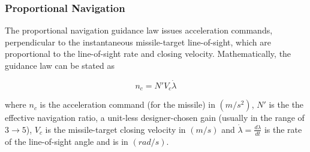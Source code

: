 \documentclass{beamer}
\begin{document}
\begin{frame}
\frametitle{Proportional Navigation}
The proportional navigation guidance law issues acceleration commands,
perpendicular to the instantaneous missile-target line-of-sight, which are
proportional to the line-of-sight rate and closing velocity. Mathematically, the
guidance law can be stated as

\begin{equation}
n_c= N' V_c \dot{\lambda} \nonumber
\label{PNeq}
\end{equation}

where $n_c$ is the acceleration command (for the missile) in $(m/s^2)$, $N'$ is the the effective navigation ratio, a unit-less designer-chosen gain (usually in the range of $3 \to 5$), $V_c$ is the missile-target closing velocity in $(m/s)$ and $\dot{\lambda} = \frac{d\lambda}{dt}$ is the rate of the line-of-sight angle and is in $(rad/s)$.
\end{frame}
\end{document}

